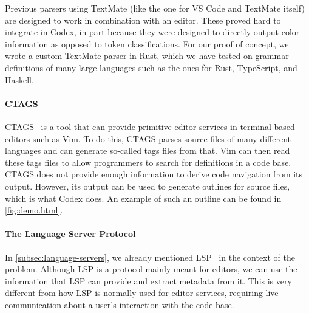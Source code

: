 

Previous parsers using TextMate (like the one for VS Code and TextMate itself) are designed to work in combination with an editor.
These proved hard to integrate in Codex, in part because they were designed to directly output color information as opposed to token classifications.
For our proof of concept, we wrote a custom TextMate parser in Rust, which we have tested on grammar definitions of many large languages such as the ones for Rust, TypeScript, and Haskell.

\paragraph{CTAGS}
CTAGS~\cite{ctags} is a tool that can provide primitive editor services in terminal-based editors such as Vim.
To do this, CTAGS parses source files of many different languages and can generate so-called tags files from that.
Vim can then read these tags files to allow programmers to search for definitions in a code base.
CTAGS does not provide enough information to derive code navigation from its output.
However, its output can be used to generate outlines for source files, which is what Codex does.
An example of such an outline can be found in \cref{fig:demo.html}.

\paragraph{The Language Server Protocol}

In \cref{subsec:language-servers}, we already mentioned \ac{LSP}~\cite{lsp} in the context of the \problem{\times} problem.
Although \ac{LSP} is a protocol mainly meant for editors, we can use the information that \ac{LSP} can provide and extract metadata from it.
This is very different from how \ac{LSP} is normally used for editor services, requiring live communication about a user's interaction with the code base.

